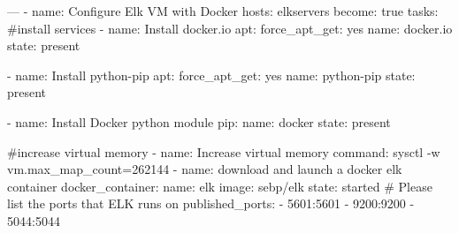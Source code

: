 ---
- name: Configure Elk VM with Docker
  hosts: elkservers
  become: true
  tasks:
#install services      
  - name: Install docker.io
    apt:
      force_apt_get: yes
      name: docker.io
      state: present

  - name: Install python-pip
    apt:
      force_apt_get: yes
      name: python-pip
      state: present

  - name: Install Docker python module
    pip:
      name: docker
      state: present

#increase virtual memory
  - name: Increase virtual memory
    command: sysctl -w vm.max_map_count=262144
  - name: download and launch a docker elk container
    docker_container:
      name: elk
      image: sebp/elk
      state: started
    # Please list the ports that ELK runs on
      published_ports:
        - 5601:5601
        - 9200:9200
        - 5044:5044

